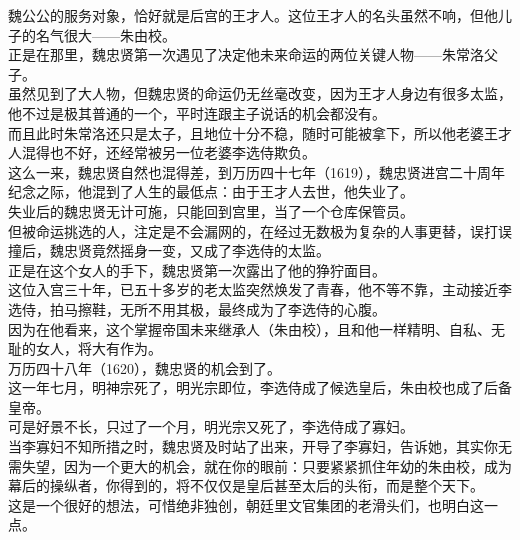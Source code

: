 \begin{multicols}{\theparacolNo}
魏公公的服务对象，恰好就是后宫的王才人。这位王才人的名头虽然不响，但他儿子的名气很大——朱由校。\\

正是在那里，魏忠贤第一次遇见了决定他未来命运的两位关键人物——朱常洛父子。\\

虽然见到了大人物，但魏忠贤的命运仍无丝毫改变，因为王才人身边有很多太监，他不过是极其普通的一个，平时连跟主子说话的机会都没有。\\

而且此时朱常洛还只是太子，且地位十分不稳，随时可能被拿下，所以他老婆王才人混得也不好，还经常被另一位老婆李选侍欺负。\\

这么一来，魏忠贤自然也混得差，到万历四十七年（1619），魏忠贤进宫二十周年纪念之际，他混到了人生的最低点：由于王才人去世，他失业了。\\

失业后的魏忠贤无计可施，只能回到宫里，当了一个仓库保管员。\\

但被命运挑选的人，注定是不会漏网的，在经过无数极为复杂的人事更替，误打误撞后，魏忠贤竟然摇身一变，又成了李选侍的太监。\\

正是在这个女人的手下，魏忠贤第一次露出了他的狰狞面目。\\

这位入宫三十年，已五十多岁的老太监突然焕发了青春，他不等不靠，主动接近李选侍，拍马擦鞋，无所不用其极，最终成为了李选侍的心腹。\\

因为在他看来，这个掌握帝国未来继承人（朱由校），且和他一样精明、自私、无耻的女人，将大有作为。\\

万历四十八年（1620），魏忠贤的机会到了。\\

这一年七月，明神宗死了，明光宗即位，李选侍成了候选皇后，朱由校也成了后备皇帝。\\

可是好景不长，只过了一个月，明光宗又死了，李选侍成了寡妇。\\

当李寡妇不知所措之时，魏忠贤及时站了出来，开导了李寡妇，告诉她，其实你无需失望，因为一个更大的机会，就在你的眼前：只要紧紧抓住年幼的朱由校，成为幕后的操纵者，你得到的，将不仅仅是皇后甚至太后的头衔，而是整个天下。\\

这是一个很好的想法，可惜绝非独创，朝廷里文官集团的老滑头们，也明白这一点。\\


\end{multicols}

